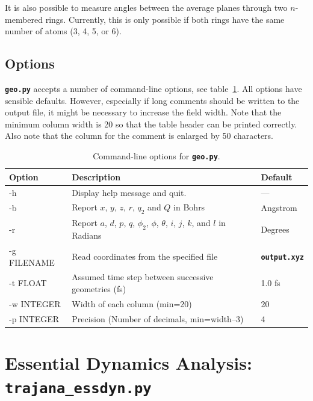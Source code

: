 \documentclass[a4paper,10pt,DIV=15,openany]{scrbook}
\newcommand{\ttt}[1]{\textbf{\texttt{#1}}}
\begin{document}
It is also possible to measure angles between the average planes through two $n$-membered rings.
Currently, this is only possible if both rings have the same number of atoms (3, 4, 5, or 6).

\subsection{Options}

\ttt{geo.py} accepts a number of command-line options, see table~\ref{tab:Geo_options}. All options have sensible defaults. However, especially if long comments should be written to the output file, it might be necessary to increase the field width. Note that the minimum column width is 20 so that the table header can be printed correctly.
Also note that the column for the comment is enlarged by 50 characters.

\begin{table}[htb]
  \centering
  \caption{Command-line options for \ttt{geo.py}. }
  \label{tab:Geo_options}
  \begin{tabular}{>{\ttfamily}lll}
    \hline
    \rmfamily Option         &Description    &Default\\
    \hline
    -h          &Display help message and quit.         &---       \\
    -b          &Report $x$, $y$, $z$, $r$, $q_2$ and $Q$ in Bohrs       &Angstrom\\
    -r          &Report $a$, $d$, $p$, $q$, $\phi_2$, $\phi$, $\theta$, $i$, $j$, $k$, and $l$ in Radians         &Degrees\\
    -g FILENAME &Read coordinates from the specified file       &\ttt{output.xyz}\\
    -t FLOAT    &Assumed time step between successive geometries (fs)    &1.0 fs\\
    -w INTEGER  &Width of each column (min=20)                   &20\\
    -p INTEGER  &Precision (Number of decimals, min=width--3)         &4\\
    \hline
  \end{tabular}
\end{table}






\section{Essential Dynamics Analysis: \ttt{trajana\_essdyn.py}}\label{sec:trajana_essdyn.py}
\end{document}
